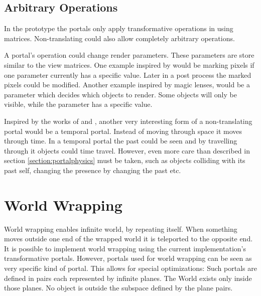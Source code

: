 \subsection{Arbitrary Operations}

In the prototype the portals only apply transformative operations in using matrices. Non-translating could also allow completely arbitrary operations.

A portal's operation could change render parameters. These parameters are store similar to the view matrices. One example inspired by \cite{borst:2009:real} would be marking pixels if one parameter currently has a specific value. Later in a post process the marked pixels could be modified. Another example inspired by magic lenses, would be a parameter which decides which objects to render. Some objects will only be visible, while the parameter has a specific value.

Inspired by the works of \textcite{ryall:2005:temporal} and \textcite{tiesel:2009:composable}, another very interesting form of a non-translating portal would be a temporal portal. Instead of moving through space it moves through time. In a temporal portal the past could be seen and by travelling through it objects could time travel. However, even more care than described in section \ref{section:portalphysics} must be taken, such as objects colliding with its past self, changing the presence by changing the past etc.










\section{World Wrapping}
World wrapping enables infinite world, by repeating itself. When something moves outside one end of the wrapped world it is teleported to the opposite end. It is possible to implement world wrapping using the current implementation's transformative portals. However, portals used for world wrapping can be seen as very specific kind of portal. This allows for special optimizations: Such portals are defined in pairs each represented by infinite planes. The World exists only inside those planes. No object is outside the subspace defined by the plane pairs. 

